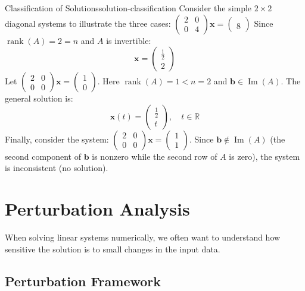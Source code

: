\documentclass[../../main.tex]{subfiles}
\begin{document}
\begin{example}{Classification of Solutions}{solution-classification}
    Consider the simple $2 \times 2$ diagonal systems to illustrate the three cases: $\begin{pmatrix} 2 & 0 \\ 0 & 4 \end{pmatrix} \mathbf{x} = \begin{pmatrix} \\ 8 \end{pmatrix}$
    Since $\operatorname{rank}(A) = 2 = n$ and $A$ is invertible:
    \[
        \mathbf{x} = \begin{pmatrix} \frac12 \\ 2 \end{pmatrix} \tag{unique solution}
    \]
    Let $\begin{pmatrix} 2 & 0 \\ 0 & 0 \end{pmatrix} \mathbf{x} = \begin{pmatrix} 1 \\ 0 \end{pmatrix}$. Here $\operatorname{rank}(A) = 1 < n = 2$ and $\mathbf{b} \in \operatorname{Im}(A)$. The general solution is:
    \[
        \mathbf{x}(t) = \begin{pmatrix} \frac12 \\ t \end{pmatrix}, \quad t \in \mathbb{R} \tag{infinitely many solutions}
    \]
    Finally, consider the system: $\begin{pmatrix} 2 & 0 \\ 0 & 0 \end{pmatrix} \mathbf{x} = \begin{pmatrix} 1 \\ 1 \end{pmatrix}$.
    Since $\mathbf{b} \notin \operatorname{Im}(A)$ (the second component of $\mathbf{b}$ is nonzero while the second row of $A$ is zero), the system is inconsistent (no solution).
\end{example}

\section{Perturbation Analysis}
When solving linear systems numerically, we often want to understand how sensitive the solution is to small changes in the input data.

\subsection{Perturbation Framework}
\end{document}
